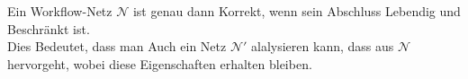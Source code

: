 Ein Workflow-Netz $\mathcal{N}$ ist genau dann Korrekt, wenn sein Abschluss Lebendig und Beschränkt ist.\\
Dies Bedeutet, dass man Auch ein Netz $\mathcal{N}'$ alalysieren kann, dass aus $\mathcal{N}$ hervorgeht, wobei diese Eigenschaften erhalten bleiben.